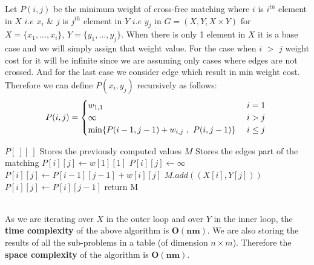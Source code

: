 \documentclass[a4paper,11pt]{article}
\theoremstyle{quest}
\newenvironment{solution}[2][Solution]{\begin{trivlist}
		\item[\hskip \labelsep {\bfseries #1}\hskip \labelsep {\bfseries #2.}]}{\end{trivlist}}
\begin{document}
\newpage
\begin{solution}2 Let $P(i,j)$ be the minimum weight of cross-free matching where $i$ is $i^{th}$ element in $X$ $i.e$ $x_i$ \& $j$ is  $j^{th}$ element in $Y$ $i.e$ $y_j$ in $G = (X, Y, X \times Y )$ for $X = \{x_1, . . . , x_i\}$, $Y = \{y_1, . . . , y_j\}$. When there is only 1 element in $X$ it is a base case and we will simply assign that weight value. For the case when $i$ $>$ $j$ weight cost for it will be infinite since we are assuming only cases where edges are not crossed. And for the last case we consider edge which result in min weight cost. Therefore we can define $P(x_i,y_j)$ recursively as follows:
	\begin{align*}
	P(i,j) =
	\begin{cases} 
	w_{1,1}    \hfill & \text{ $i = 1$ } \\
	\infty    \hfill & \text{ $i>j$ } \\
	\hfill \min \{P(i-1,j-1)+w_{i,j}~,~P(i,j-1)\} \hfill & \text{ $i\le j$ }
	\end{cases}
	\end{align*}
	\begin{algorithm}
		\caption{}
		\label{Algorithm}
		\begin{algorithmic}
			\State $P[~][~]$
			\Comment Stores the previously computed values
			\State $M$
			\Comment Stores the edges part of the matching
			\State $P[i][j] \gets w[1][1]$
			\EndIf
			\State $P[i][j] \gets \infty$
			\Else
			\State $P[i][j] \gets P[i-1][j-1] + w[i][j]$
			\State $M.add((X[i],Y[j]))$
			\Else
			\State $P[i][j] \gets P[i][j-1]$
			\EndIf
			\EndIf
			\EndFor
			\EndFor
			\State return M 
			\EndFunction	
		\end{algorithmic} 
	\end{algorithm}\\
	As we are iterating over $X$ in the outer loop and over $Y$ in the inner loop, the \textbf{time complexity} of the above algorithm is $\mathbf{O(nm)}$. We are also storing the results of all the sub-problems in a table (of dimension $n\times m$). Therefore the \textbf{space complexity} of the algorithm is $\mathbf{O(nm)}$.

\end{solution} 
\newpage
\end{document}
